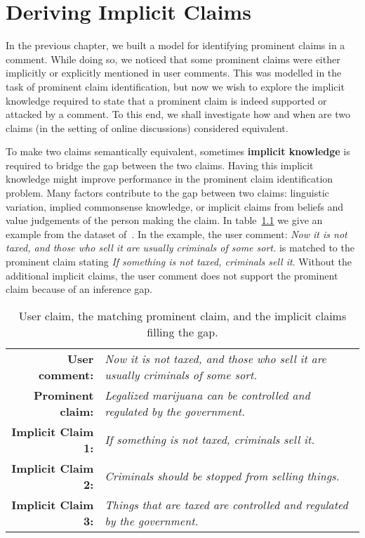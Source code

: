 \chapter{Deriving Implicit Claims}
\label{chap:deriving_implicit}

In the previous chapter, we built a model for identifying 
prominent claims in a comment. While doing so, we noticed that 
some prominent claims were either implicitly or explicitly mentioned
in user comments. This was modelled in the task of prominent claim
identification, but now we wish to explore the implicit knowledge required
to state that a prominent claim is indeed supported or attacked by a comment.
To this end, we shall investigate how and when are two claims
(in the setting of online discussions) considered equivalent. 

To make two claims semantically equivalent, sometimes \textbf{implicit knowledge} is
required to bridge the gap between the two claims. 
Having this implicit knowledge might improve performance in the 
prominent claim identification problem. 
Many factors contribute to the gap between two claims: linguistic variation,
implied commonsense knowledge, or implicit claims from beliefs and value
judgements of the person making the claim. In table~\ref{tab:premise_example} we
give an example from the dataset of~\citet{hasan2014you}. 
In the example, the user comment: 
\emph{Now it is not taxed, and those who sell it are usually criminals of some sort.}
is matched to  the prominent claim stating
\emph{If something is not taxed, criminals sell it}.
Without the additional implicit claims, the user comment does not support the prominent 
claim because of an inference gap. 


\begin{table}
{\normalsize
\begin{tabular}{|@{\ }r@{\ \  }p{}|}
\hline
\textbf{User comment:} & \emph{Now it is not taxed, and those who sell it are
	usually criminals of some sort.}\\
\textbf{Prominent claim:} & \emph{Legalized marijuana can be controlled and
	regulated by the government.}\\
\textbf{Implicit Claim 1:} & \emph{If something is not taxed, criminals sell
	it.}\\
\textbf{Implicit Claim 2:} & \emph{Criminals should be stopped from selling
	things.}\\
\textbf{Implicit Claim 3:} & \emph{Things that are taxed are controlled and
	regulated by the government.}\\
\hline
\end{tabular}}
\caption{User claim, the matching prominent claim, and the implicit claims filling the gap.}
\label{tab:premise_example}
\end{table}

